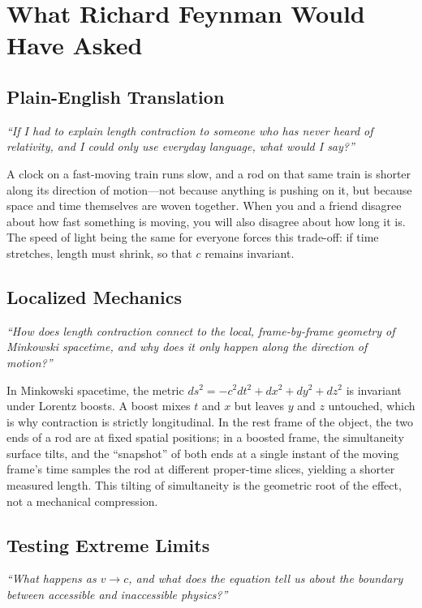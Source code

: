 \section*{What Richard Feynman Would Have Asked}

\subsection*{Plain-English Translation}
\textit{``If I had to explain length contraction to someone who has never heard of relativity, and I could only use everyday language, what would I say?''}

A clock on a fast-moving train runs slow, and a rod on that same train is shorter along its direction of motion---not because anything is pushing on it, but because space and time themselves are woven together. When you and a friend disagree about how fast something is moving, you will also disagree about how long it is. The speed of light being the same for everyone forces this trade-off: if time stretches, length must shrink, so that $c$ remains invariant.

\subsection*{Localized Mechanics}
\textit{``How does length contraction connect to the local, frame-by-frame geometry of Minkowski spacetime, and why does it only happen along the direction of motion?''}

In Minkowski spacetime, the metric $ds^{2} = -c^{2}dt^{2} + dx^{2} + dy^{2} + dz^{2}$ is invariant under Lorentz boosts. A boost mixes $t$ and $x$ but leaves $y$ and $z$ untouched, which is why contraction is strictly longitudinal. In the rest frame of the object, the two ends of a rod are at fixed spatial positions; in a boosted frame, the simultaneity surface tilts, and the ``snapshot'' of both ends at a single instant of the moving frame's time samples the rod at different proper-time slices, yielding a shorter measured length. This tilting of simultaneity is the geometric root of the effect, not a mechanical compression.

\subsection*{Testing Extreme Limits}
\textit{``What happens as $v \to c$, and what does the equation tell us about the boundary between accessible and inaccessible physics?''}

